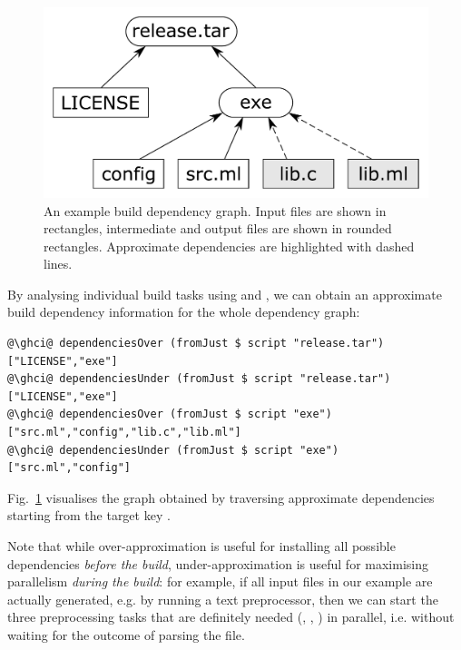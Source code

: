 {\begin{figure}
\centerline{\includegraphics[scale=0.3]{fig/build-dependencies.pdf}}
\vspace{-2mm}
\caption{An example build dependency graph. Input files are shown in rectangles,
intermediate and output files are shown in rounded rectangles. Approximate
dependencies are highlighted with dashed lines.}
\label{fig-build}
\vspace{-4mm}
\end{figure}

By analysing individual build tasks using  and
, we can obtain an approximate build dependency
information for the whole dependency graph:

\vspace{0.5mm}
\begin{verbatim}
@\ghci@ dependenciesOver (fromJust $ script "release.tar")
["LICENSE","exe"]
@\ghci@ dependenciesUnder (fromJust $ script "release.tar")
["LICENSE","exe"]
@\ghci@ dependenciesOver (fromJust $ script "exe")
["src.ml","config","lib.c","lib.ml"]
@\ghci@ dependenciesUnder (fromJust $ script "exe")
["src.ml","config"]
\end{verbatim}
\vspace{0.5mm}

\noindent
Fig.~\ref{fig-build} visualises the graph obtained by traversing approximate
dependencies starting from the target key .

Note that while over-approximation is useful for installing all possible
dependencies \emph{before the build}, under-approximation is useful for
maximising parallelism \emph{during the build}: for example, if all input files
in our example are actually generated, e.g. by running a text preprocessor, then
we can start the three preprocessing tasks that are definitely needed
(, , ) in parallel, i.e. without waiting
for the outcome of parsing the  file.

}
